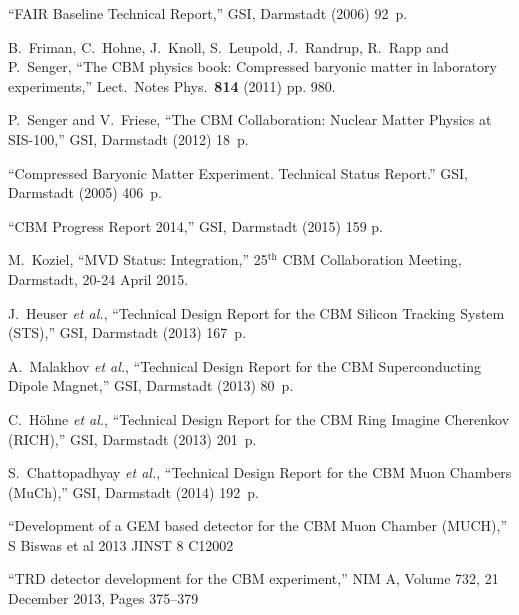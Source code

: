 \begin{thebibliography}{99}

``FAIR Baseline Technical Report,'' GSI, Darmstadt  (2006) 92~p. \\


B.~Friman, C.~Hohne, J.~Knoll, S.~Leupold, J.~Randrup, R.~Rapp and P.~Senger, ``The CBM physics book: Compressed baryonic matter in laboratory experiments,''
  Lect.\ Notes Phys.\  {\bf 814} (2011) pp. 980.

  P.~Senger and V.~Friese, ``The CBM Collaboration: Nuclear Matter Physics at SIS-100,'' GSI, Darmstadt (2012) 18~p.

``Compressed Baryonic Matter Experiment. Technical Status Report.'' GSI, Darmstadt (2005) 406~p.

``CBM Progress Report 2014,'' GSI, Darmstadt (2015) 159 p.


M.~Koziel, ``MVD Status: Integration,'' 25$^\mathrm{th}$ CBM Collaboration Meeting, Darmstadt, 20-24 April 2015.\\ 

J.~Heuser {\it et al.}, ``Technical Design Report for the CBM Silicon Tracking System (STS),'' GSI, Darmstadt (2013) 167~p.

A.~Malakhov {\it et al.}, ``Technical Design Report for the CBM Superconducting Dipole Magnet,'' GSI, Darmstadt (2013) 80~p.

C.~H\"{o}hne {\it et al.}, ``Technical Design Report for the CBM Ring Imagine Cherenkov (RICH),'' GSI, Darmstadt (2013) 201~p.

S.~Chattopadhyay {\it et al.}, ``Technical Design Report for the CBM Muon Chambers (MuCh),'' GSI, Darmstadt (2014) 192~p.

``Development of a GEM based detector for the CBM Muon Chamber (MUCH),''
S Biswas et al 2013 JINST 8 C12002

``TRD detector development for the CBM experiment,''
NIM A, Volume 732, 21 December 2013, Pages 375–379


\end{thebibliography}
